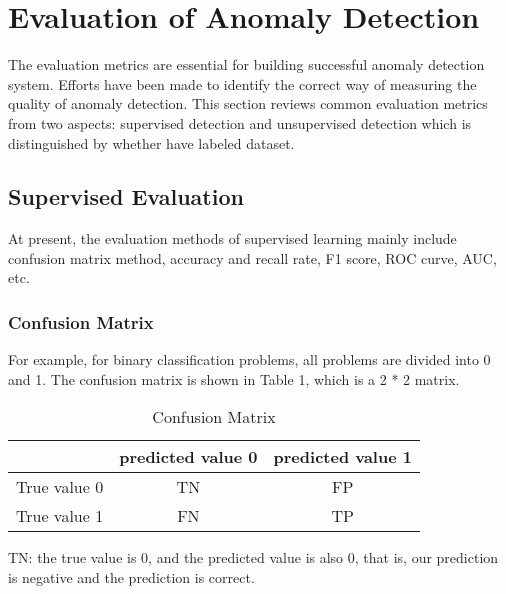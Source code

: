 
\section{Evaluation of Anomaly Detection}

The evaluation metrics are essential for 
building successful anomaly detection system. 
Efforts have been made to identify the correct way of
measuring the quality of anomaly detection. 
This section
reviews common evaluation metrics from two aspects: 
supervised detection 
and unsupervised detection which is 
distinguished by whether have labeled dataset.

\subsection{Supervised Evaluation}
At present, 
the evaluation methods of supervised learning mainly
include confusion matrix method, accuracy and recall rate,
F1 score,
ROC curve,
AUC,
etc.

\subsubsection{Confusion Matrix}
For example,
for binary classification problems,
all problems are divided into 0 and 1.
The confusion matrix is shown in Table 1,
which is a 2 * 2 matrix.

\begin{table}  \centering
  \caption{Confusion Matrix}
  \label{tbl:overall-experiments}
  \begin{tabular}{ccc}
  \toprule
    & predicted value 0 & predicted value 1  \\
  \midrule
    True value 0 & TN & FP  \\
    True value 1 & FN & TP  \\
  \bottomrule
  \end{tabular}
\end{table}


TN:
the true value is 0,
and the predicted value is also 0,
that is,
our prediction is negative and the prediction is correct.

